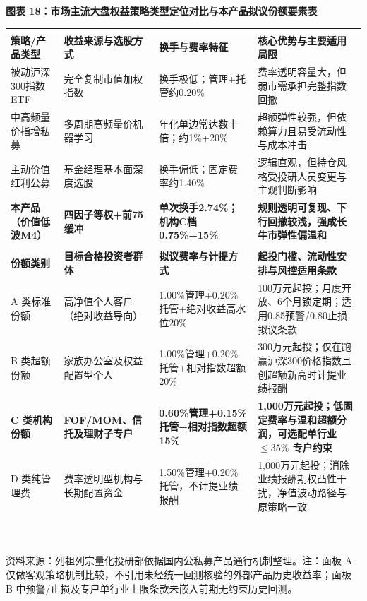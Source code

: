 \documentclass[12pt,a4paper]{article}
\newcommand{\exhibitcap}[1]{{\sffamily\bfseries\fontsize{9.6pt}{12.5pt}\selectfont\textcolor{Primary}{#1}}\\[2pt]}
\newcommand{\exhibitnote}[1]{{\fontsize{7.5pt}{10pt}\selectfont\color{GrayNote}#1\par}}
\begin{document}
\vspace{4pt}
\noindent\begin{minipage}{\textwidth}
\setlength{\parindent}{0pt}\setlength{\tabcolsep}{3.8pt}
\exhibitcap{图表 18：市场主流大盘权益策略类型定位对比与本产品拟议份额要素表}
\fontsize{7.6pt}{10.3pt}\selectfont
\begin{tabularx}{\textwidth}{@{}l l l X@{}}
  \arrayrulecolor{Primary}\toprule[1.0pt]
  \multicolumn{4}{@{}l}{\textbf{\sffamily\textcolor{Primary}{A. 市场主流沪深300权益产品类型与本策略机制特征定性对比}}}\\[1pt]
  \rowcolor{TblHdr}
  \textbf{\sffamily 策略/产品类型} & \textbf{\sffamily 收益来源与选股方式} & \textbf{\sffamily 换手与费率特征} & \textbf{\sffamily 核心优势与主要适用局限} \\
  \midrule[0.5pt]
  被动沪深300指数ETF & 完全复制市值加权指数 & 换手极低；管理+托管约0.20\% & 费率透明容量大，但弱市需承担完整指数回撤 \\
  中高频量价指增私募 & 多周期高频量价机器学习 & 年化单边常达数十倍；约1\%+20\% & 超额弹性较强，但依赖算力且易受流动性与成本冲击 \\
  主动价值红利公募 & 基金经理基本面深度选股 & 换手偏低；固定费率约1.40\% & 逻辑直观，但持仓风格受投研人员变更与主观判断影响 \\
  \textbf{\textcolor{Primary}{本产品（价值低波M4）}} & \textbf{四因子等权+前75缓冲} & \textbf{单次换手2.74\%；机构C档0.75\%+15\%} & \textbf{规则透明可复现、下行回撤较浅，强成长牛市弹性偏温和} \\
  \arrayrulecolor{RuleMuted}\midrule[0.4pt]
  \multicolumn{4}{@{}l}{\textbf{\sffamily\textcolor{Primary}{B. 本私募基金拟议份额分类、费率结构与目标合格投资者匹配表}}}\\[1pt]
  \rowcolor{TblHdr}
  \textbf{\sffamily 份额类别} & \textbf{\sffamily 目标合格投资者群体} & \textbf{\sffamily 拟议费率与计提方式} & \textbf{\sffamily 起投门槛、流动性安排与风控适用条款} \\
  \midrule[0.4pt]
  A 类标准份额 & 高净值个人客户（绝对收益导向） & 1.00\%管理+0.20\%托管+绝对收益高水位20\% & 100万元起投；月度开放、6个月锁定期；适用0.85预警/0.80止损拟议条款 \\
  B 类超额份额 & 家族办公室及权益配置型个人 & 1.00\%管理+0.20\%托管+相对指数超额20\% & 300万元起投；仅在跑赢沪深300价格指数且创超额新高时计提业绩报酬 \\
  \textbf{\textcolor{Primary}{C 类机构份额}} & \textbf{FOF/MOM、信托及理财子专户} & \textbf{0.60\%管理+0.15\%托管+相对指数超额15\%} & \textbf{1,000万元起投；低固定费率与温和超额分润，可选配单行业 $\le 35\%$ 专户约束} \\
  D 类纯管理费 & 费率透明型机构与长期配置资金 & 1.50\%管理+0.20\%托管，不计提业绩报酬 & 1,000万元起投；消除业绩报酬期权凸性干扰，净值波动路径与原策略一致 \\
  \arrayrulecolor{Primary}\bottomrule[1.0pt]
\end{tabularx}\\[3pt]
\exhibitnote{资料来源：列祖列宗量化投研部依据国内公私募产品通行机制整理。注：面板 A 仅做客观策略机制比较，不引用未经统一回测核验的外部产品历史收益率；面板 B 中预警/止损及专户单行业上限条款未嵌入前期无约束历史回测。}
\end{minipage}
\vspace{5pt}
\end{document}

